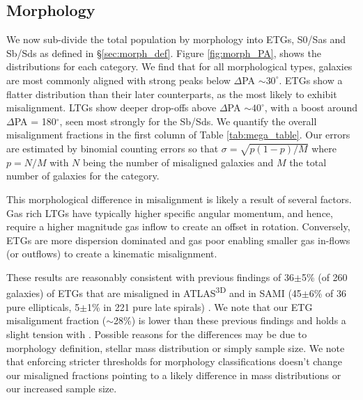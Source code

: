 \documentclass[fleqn,usenatbib]{mnras}
\begin{document}
\subsection{Morphology}
We now sub-divide the total population by morphology into ETGs, S0/Sas and Sb/Sds as defined in \S\ref{sec:morph_def}. Figure \ref{fig:morph_PA}, shows the distributions for each category. We find that for all morphological types, galaxies are most commonly aligned with strong peaks below $\Delta$PA $\sim 30^{\circ}$. ETGs show a flatter distribution than their later counterparts, as the most likely to exhibit misalignment. LTGs show deeper drop-offs above $\Delta$PA $\sim 40^{\circ}$, with a boost around $\Delta$PA = 180$^{\circ}$, seen most strongly for the Sb/Sds. We quantify the overall misalignment fractions in the first column of Table \ref{tab:mega_table}. Our errors are estimated by binomial counting errors so that $\sigma = \sqrt{p(1-p) / M}$ where $p = N/M$ with $N$ being the number of misaligned galaxies and $M$ the total number of galaxies for the category.

This morphological difference in misalignment is likely a result of several factors. Gas rich LTGs have typically higher specific angular momentum, and hence, require a higher magnitude gas inflow to create an offset in rotation. Conversely, ETGs are more dispersion dominated and gas poor enabling smaller gas in-flows (or outflows) to create a kinematic misalignment. 

These results are reasonably consistent with previous findings of 36$\pm$5\% (of 260 galaxies) of ETGs that are misaligned in ATLAS\textsuperscript{3D} and in SAMI (45$\pm$6\% of 36 pure ellipticals, 5$\pm$1\% in 221 pure late spirals) \citep[][]{davis2011, bryant2019}. We note that our ETG misalignment fraction ($\sim$28\%) is lower than these previous findings and holds a slight tension with \citet{bryant2019}. Possible reasons for the differences may be due to morphology definition, stellar mass distribution or simply sample size. We note that enforcing stricter thresholds for morphology classifications doesn't change our misaligned fractions pointing to a likely difference in mass distributions or our increased sample size. 
\end{document}
